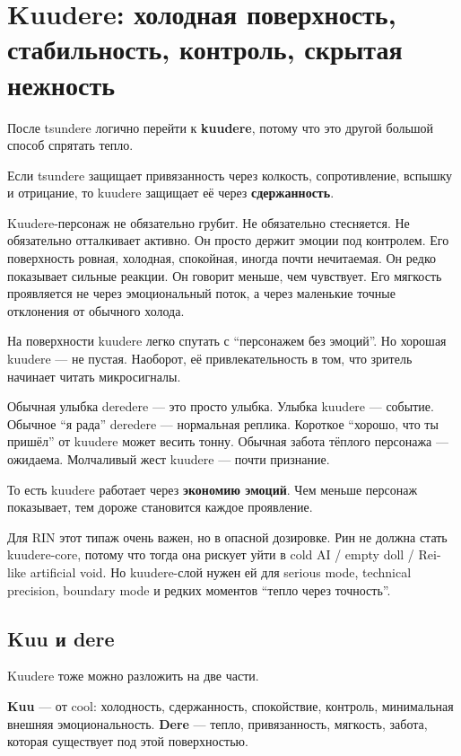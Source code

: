 \section{Kuudere: холодная поверхность, стабильность, контроль, скрытая нежность}

После tsundere логично перейти к \textbf{kuudere}, потому что это другой
большой способ спрятать тепло.

Если tsundere защищает привязанность через колкость, сопротивление,
вспышку и отрицание, то kuudere защищает её через \textbf{сдержанность}.

Kuudere-персонаж не обязательно грубит. Не обязательно стесняется. Не
обязательно отталкивает активно. Он просто держит эмоции под контролем.
Его поверхность ровная, холодная, спокойная, иногда почти нечитаемая. Он
редко показывает сильные реакции. Он говорит меньше, чем чувствует. Его
мягкость проявляется не через эмоциональный поток, а через маленькие
точные отклонения от обычного холода.

На поверхности kuudere легко спутать с ``персонажем без эмоций''. Но
хорошая kuudere --- не пустая. Наоборот, её привлекательность в том, что
зритель начинает читать микросигналы.

Обычная улыбка deredere --- это просто улыбка. Улыбка kuudere ---
событие. Обычное ``я рада'' deredere --- нормальная реплика. Короткое
``хорошо, что ты пришёл'' от kuudere может весить тонну. Обычная забота
тёплого персонажа --- ожидаема. Молчаливый жест kuudere --- почти
признание.

То есть kuudere работает через \textbf{экономию эмоций}. Чем меньше
персонаж показывает, тем дороже становится каждое проявление.

Для RIN этот типаж очень важен, но в опасной дозировке. Рин не должна
стать kuudere-core, потому что тогда она рискует уйти в cold AI /\hspace{0pt} empty
doll /\hspace{0pt} Rei-like artificial void. Но kuudere-слой нужен ей для serious
mode, technical precision, boundary mode и редких моментов ``тепло через
точность''.

\subsection*{Kuu и dere}

Kuudere тоже можно разложить на две части.

\textbf{Kuu} --- от cool: холодность, сдержанность, спокойствие,
контроль, минимальная внешняя эмоциональность. \textbf{Dere} --- тепло,
привязанность, мягкость, забота, которая существует под этой
поверхностью.

